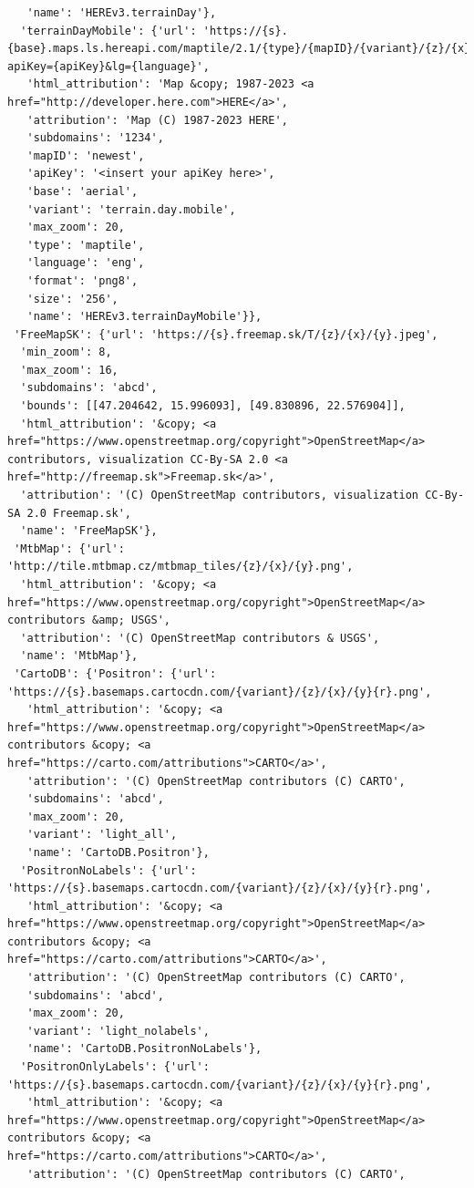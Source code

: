 \documentclass[
  letterpaper,
  DIV=11,
  numbers=noendperiod]{scrreprt}
\begin{document}
\begin{verbatim}
   'name': 'HEREv3.terrainDay'},
  'terrainDayMobile': {'url': 'https://{s}.{base}.maps.ls.hereapi.com/maptile/2.1/{type}/{mapID}/{variant}/{z}/{x}/{y}/{size}/{format}?apiKey={apiKey}&lg={language}',
   'html_attribution': 'Map &copy; 1987-2023 <a href="http://developer.here.com">HERE</a>',
   'attribution': 'Map (C) 1987-2023 HERE',
   'subdomains': '1234',
   'mapID': 'newest',
   'apiKey': '<insert your apiKey here>',
   'base': 'aerial',
   'variant': 'terrain.day.mobile',
   'max_zoom': 20,
   'type': 'maptile',
   'language': 'eng',
   'format': 'png8',
   'size': '256',
   'name': 'HEREv3.terrainDayMobile'}},
 'FreeMapSK': {'url': 'https://{s}.freemap.sk/T/{z}/{x}/{y}.jpeg',
  'min_zoom': 8,
  'max_zoom': 16,
  'subdomains': 'abcd',
  'bounds': [[47.204642, 15.996093], [49.830896, 22.576904]],
  'html_attribution': '&copy; <a href="https://www.openstreetmap.org/copyright">OpenStreetMap</a> contributors, visualization CC-By-SA 2.0 <a href="http://freemap.sk">Freemap.sk</a>',
  'attribution': '(C) OpenStreetMap contributors, visualization CC-By-SA 2.0 Freemap.sk',
  'name': 'FreeMapSK'},
 'MtbMap': {'url': 'http://tile.mtbmap.cz/mtbmap_tiles/{z}/{x}/{y}.png',
  'html_attribution': '&copy; <a href="https://www.openstreetmap.org/copyright">OpenStreetMap</a> contributors &amp; USGS',
  'attribution': '(C) OpenStreetMap contributors & USGS',
  'name': 'MtbMap'},
 'CartoDB': {'Positron': {'url': 'https://{s}.basemaps.cartocdn.com/{variant}/{z}/{x}/{y}{r}.png',
   'html_attribution': '&copy; <a href="https://www.openstreetmap.org/copyright">OpenStreetMap</a> contributors &copy; <a href="https://carto.com/attributions">CARTO</a>',
   'attribution': '(C) OpenStreetMap contributors (C) CARTO',
   'subdomains': 'abcd',
   'max_zoom': 20,
   'variant': 'light_all',
   'name': 'CartoDB.Positron'},
  'PositronNoLabels': {'url': 'https://{s}.basemaps.cartocdn.com/{variant}/{z}/{x}/{y}{r}.png',
   'html_attribution': '&copy; <a href="https://www.openstreetmap.org/copyright">OpenStreetMap</a> contributors &copy; <a href="https://carto.com/attributions">CARTO</a>',
   'attribution': '(C) OpenStreetMap contributors (C) CARTO',
   'subdomains': 'abcd',
   'max_zoom': 20,
   'variant': 'light_nolabels',
   'name': 'CartoDB.PositronNoLabels'},
  'PositronOnlyLabels': {'url': 'https://{s}.basemaps.cartocdn.com/{variant}/{z}/{x}/{y}{r}.png',
   'html_attribution': '&copy; <a href="https://www.openstreetmap.org/copyright">OpenStreetMap</a> contributors &copy; <a href="https://carto.com/attributions">CARTO</a>',
   'attribution': '(C) OpenStreetMap contributors (C) CARTO',

\end{verbatim}
\end{document}
